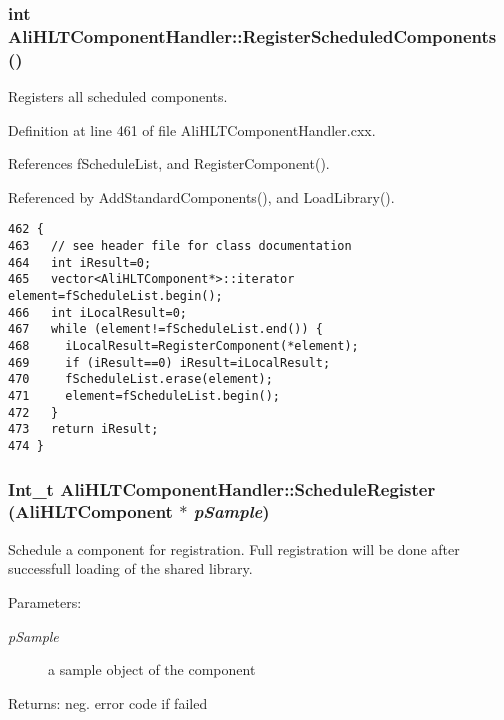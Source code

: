 \subsubsection{\setlength{\rightskip}{0pt plus 5cm}int Ali\-HLTComponent\-Handler::Register\-Scheduled\-Components ()}\label{classAliHLTComponentHandler_a11}


Registers all scheduled components. 

Definition at line 461 of file Ali\-HLTComponent\-Handler.cxx.

References f\-Schedule\-List, and Register\-Component().

Referenced by Add\-Standard\-Components(), and Load\-Library().

\footnotesize\begin{verbatim}462 {
463   // see header file for class documentation
464   int iResult=0;
465   vector<AliHLTComponent*>::iterator element=fScheduleList.begin();
466   int iLocalResult=0;
467   while (element!=fScheduleList.end()) {
468     iLocalResult=RegisterComponent(*element);
469     if (iResult==0) iResult=iLocalResult;
470     fScheduleList.erase(element);
471     element=fScheduleList.begin();
472   }
473   return iResult;
474 }
\end{verbatim}\normalsize 


\subsubsection{\setlength{\rightskip}{0pt plus 5cm}Int\_\-t Ali\-HLTComponent\-Handler::Schedule\-Register ({\bf Ali\-HLTComponent} $\ast$ {\em p\-Sample})}\label{classAliHLTComponentHandler_a9}


Schedule a component for registration. Full registration will be done after successfull loading of the shared library. \begin{Desc}
\item[Parameters:]
\begin{description}
\item[{\em p\-Sample}]a sample object of the component \end{description}
\end{Desc}
\begin{Desc}
\item[Returns:]neg. error code if failed \end{Desc}


